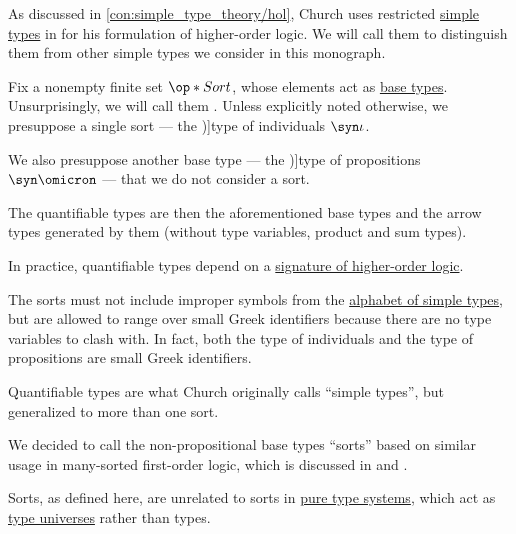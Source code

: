 \begin{definition}\label{def:quantifiable_type}\mimprovised
  As discussed in \cref{con:simple_type_theory/hol}, Church uses restricted \hyperref[def:simple_type]{simple types} in \cite{Church1940STT} for his formulation of higher-order logic. We will call them  to distinguish them from other simple types we consider in this monograph.

  Fix a nonempty finite set \( \op*{Sort} \), whose elements act as \hyperref[def:simple_type]{base types}. Unsurprisingly, we will call them . Unless explicitly noted otherwise, we presuppose a single sort --- the \term[en=type of individuals (\cite[56]{Church1940STT})]{type of individuals} \( \syn\iota \).

  We also presuppose another base type --- the \term[en=type of propositions (\cite[56]{Church1940STT})]{type of propositions} \( \syn\omicron \) --- that we do not consider a sort.

  The quantifiable types are then the aforementioned base types and the arrow types generated by them (without type variables, product and sum types).
\end{definition}
\begin{comments}
  \item In practice, quantifiable types depend on a \hyperref[def:hol_signature]{signature of higher-order logic}.

  \item The sorts must not include improper symbols from the \hyperref[def:simple_type_alphabet]{alphabet of simple types}, but are allowed to range over small Greek identifiers because there are no type variables to clash with. In fact, both the type of individuals and the type of propositions are small Greek identifiers.

  \item Quantifiable types are what Church originally calls \enquote{simple types}, but generalized to more than one sort.

  \item We decided to call the non-propositional base types \enquote{sorts} based on similar usage in many-sorted first-order logic, which is discussed in \cite[\S 4.4.13]{TroelstraSchwichtenberg2000BasicProofTheory} and \cite[def. 62]{GoguenBurstall1992Institutions}.

  Sorts, as defined here, are unrelated to sorts in \hyperref[def:pure_type_system]{pure type systems}, which act as \hyperref[con:type_universe]{type universes} rather than types.
\end{comments}

